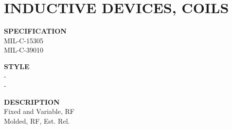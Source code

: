 \section{INDUCTIVE DEVICES, COILS}

\begin{minipage}[t]{0.24\textwidth}
    \textbf{SPECIFICATION}\\
    MIL-C-15305\\MIL-C-39010
\end{minipage}
\hfill
\begin{minipage}[t]{0.12\textwidth}
    \textbf{STYLE}\\
    -\\-
\end{minipage}
\hfill
\begin{minipage}[t]{0.61\textwidth}
    \textbf{DESCRIPTION}\\
    Fixed and Variable, RF\\Molded, RF, Est. Rel.
\end{minipage}

